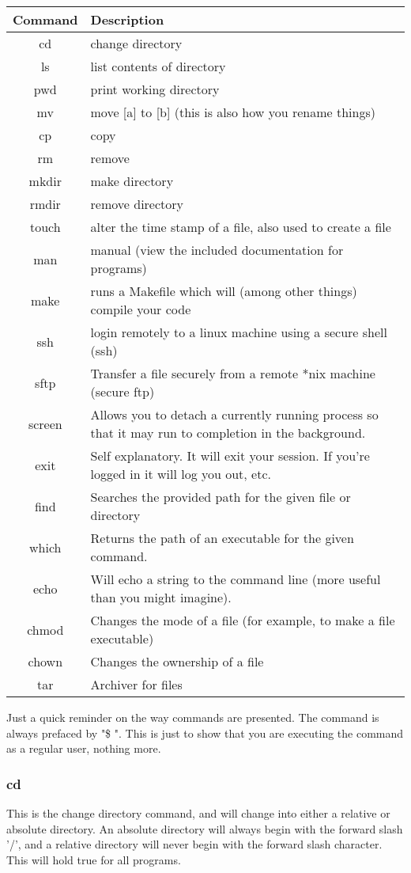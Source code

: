 \begin{tabularx}{\textwidth}{ | c | X | }
	\hline
	\textbf{Command}	& \textbf{Description} \\
	\hline
	cd		& change directory \\
	ls		& list contents of directory \\
	pwd		& print working directory \\
	mv		& move [a] to [b] (this is also how you rename things) \\
	cp		& copy \\
	rm		& remove \\
	mkdir	& make directory \\
	rmdir	& remove directory \\
	touch	& alter the time stamp of a file, also used to create a file \\
	man		& manual (view the included documentation for programs) \\
	make	& runs a Makefile which will (among other things) compile your code \\
	ssh		& login remotely to a linux machine using a secure shell (ssh) \\
	sftp	& Transfer a file securely from a remote *nix machine (secure ftp) \\
	screen	& Allows you to detach a currently running process so that it may run to completion in the background. \\
	exit	& Self explanatory.  It will exit your session.  If you're logged in it will log you out, etc. \\
	find	& Searches the provided path for the given file or directory \\
	which	& Returns the path of an executable for the given command.  \\
	echo	& Will echo a string to the command line (more useful than you might imagine). \\
	chmod	& Changes the mode of a file (for example, to make a file executable) \\
	chown	& Changes the ownership of a file \\
	tar		& Archiver for files \\
	\hline
\end{tabularx}
		
Just a quick reminder on the way commands are presented.  The command is always prefaced by "\$ ".  This is just to show that you are executing the command as a regular user, nothing more.

\subsubsection{cd} \mdseries
This is the change directory command, and will change into either a relative or absolute directory.  An absolute directory will always begin with the forward slash '/', and a relative directory will never begin with the forward slash character.  This will hold true for all programs.

